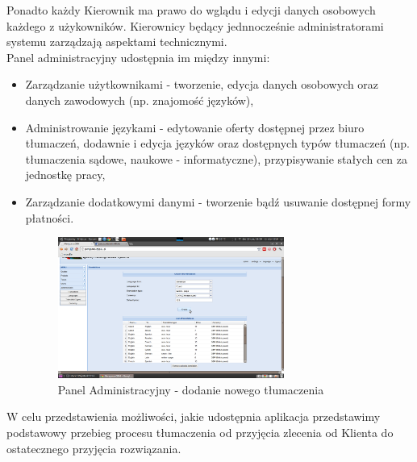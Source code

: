 \documentclass[licencjacka]{pracamgr}
\begin{document}
Ponadto każdy Kierownik ma prawo do wglądu i edycji danych osobowych każdego z użykowników. 
Kierownicy będący jednnocześnie administratorami systemu zarządzają aspektami technicznymi.\\
Panel administracyjny udostępnia im między innymi:
\begin{itemize}
\item Zarządzanie użytkownikami - tworzenie, edycja danych osobowych oraz danych zawodowych (np. znajomość języków),
\item  Administrowanie językami - edytowanie oferty dostępnej przez biuro tłumaczeń, dodawnie i edycja języków oraz dostępnych typów tłumaczeń (np. tłumaczenia sądowe, naukowe - informatyczne), przypisywanie stałych cen za jednostkę pracy,
\item  Zarządzanie dodatkowymi danymi - tworzenie bądź usuwanie dostępnej formy płatności.
\begin{figure}[ht!]
\centering
\includegraphics[width=0.7\textwidth]{resources/panel_administracyjny.png}
\caption{Panel Administracyjny - dodanie nowego tłumaczenia}
\end{figure}
\end{itemize}
W celu przedstawienia możliwości, jakie udostępnia aplikacja przedstawimy podstawowy przebieg procesu tłumaczenia od przyjęcia zlecenia od Klienta do ostatecznego przyjęcia rozwiązania.\\
\end{document}
